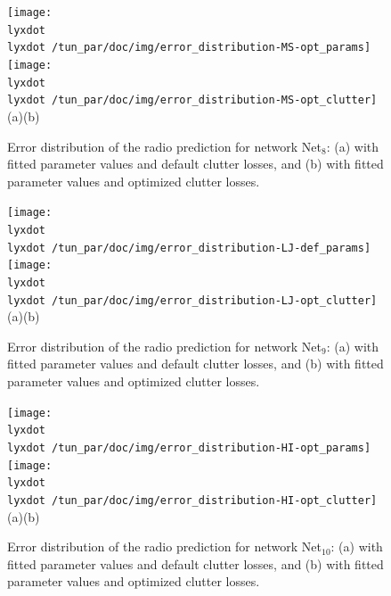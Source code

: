 \begin{figure}[h]
\centering

\texttt{[image: \\lyxdot \\lyxdot /tun\_par/doc/img/error\_distribution-MS-opt\_params]}\texttt{[image: \\lyxdot \\lyxdot /tun\_par/doc/img/error\_distribution-MS-opt\_clutter]}\\\hspace{0.4cm}(a)\hspace{6.7cm}(b)

\caption{Error distribution of the radio prediction for network Net$_{8}$:
(a) with fitted parameter values and default clutter losses, and (b)
with fitted parameter values and optimized clutter losses.\label{fig:05-Clutter_error_distribution_for_Net8}}
\end{figure}


\begin{figure}[h]
\centering

\texttt{[image: \\lyxdot \\lyxdot /tun\_par/doc/img/error\_distribution-LJ-def\_params]}\texttt{[image: \\lyxdot \\lyxdot /tun\_par/doc/img/error\_distribution-LJ-opt\_clutter]}\\\hspace{0.4cm}(a)\hspace{6.7cm}(b)

\caption{Error distribution of the radio prediction for network Net$_{9}$:
(a) with fitted parameter values and default clutter losses, and (b)
with fitted parameter values and optimized clutter losses.\label{fig:05-Clutter_error_distribution_for_Net9}}
\end{figure}


\begin{figure}[H]
\centering

\texttt{[image: \\lyxdot \\lyxdot /tun\_par/doc/img/error\_distribution-HI-opt\_params]}\texttt{[image: \\lyxdot \\lyxdot /tun\_par/doc/img/error\_distribution-HI-opt\_clutter]}\\\hspace{0.4cm}(a)\hspace{6.7cm}(b)

\caption{Error distribution of the radio prediction for network Net$_{10}$:
(a) with fitted parameter values and default clutter losses, and (b)
with fitted parameter values and optimized clutter losses.\label{fig:05-Clutter_error_distribution_for_Net10}}
\end{figure}


